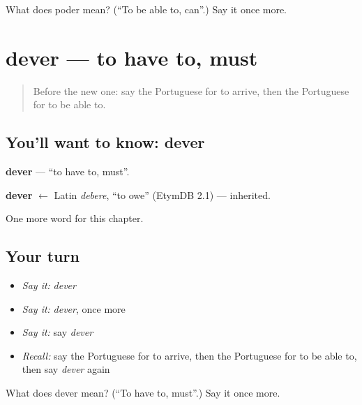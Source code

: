\begin{tcolorbox}[breakable,colback=teal!4,colframe=teal!35!black,title={Before you move on}]
What does poder mean? (\textquotedblleft{}To be able to, can\textquotedblright{}.) Say it once more.
\end{tcolorbox}
\section[dever]{dever — to have to, must}

\label{lesson:PT-C82-dever}



\begin{quote}
Before the new one: say the Portuguese for to arrive, then the Portuguese for to be able to.
\end{quote}

\subsection*{You'll want to know: dever}
\textbf{dever} — \textquotedblleft{}to have to, must\textquotedblright{}.

\begin{cousinweb}
\textbf{dever} $\leftarrow$ Latin \emph{debere}, \textquotedblleft{}to owe\textquotedblright{} (EtymDB 2.1) — inherited.
\end{cousinweb}

\begin{grammarlens}[title={What you've built}]
One more word for this chapter.
\end{grammarlens}

\subsection*{Your turn}
\begin{itemize}
\raggedright
  \item \emph{Say it:} \emph{dever}
  \item \emph{Say it:} \emph{dever}, once more
  \item \emph{Say it:} say \emph{dever}
  \item \emph{Recall:} say the Portuguese for to arrive, then the Portuguese for to be able to, then say \emph{dever} again
\end{itemize}

\begin{tcolorbox}[breakable,colback=teal!4,colframe=teal!35!black,title={Before you move on}]
What does dever mean? (\textquotedblleft{}To have to, must\textquotedblright{}.) Say it once more.
\end{tcolorbox}
